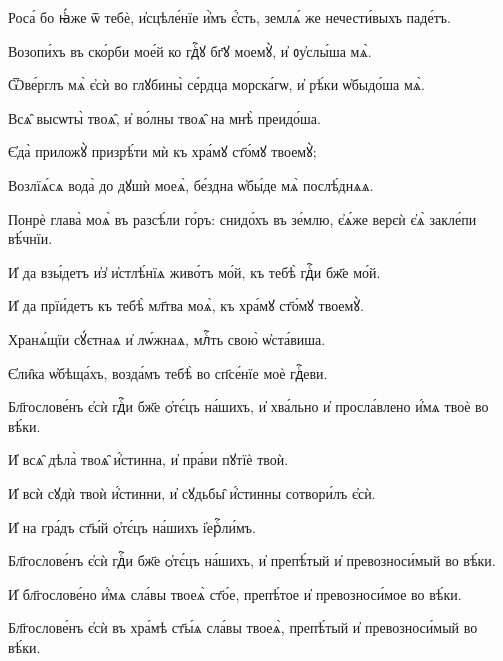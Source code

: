 \hKv Роса́ бо ꙗ҆́же ѿ тебѐ, и҆сцѣле́нїе и҆̀мъ є҆́сть,  землѧ́ же нечести́выхъ паде́тъ. 
%

%

\hKv Возопи́хъ въ ско́рби мое́й ко гдⷭ҇ꙋ бг҃ꙋ моемꙋ̀, и҆  ᲂу҆слы́ша мѧ̀. 

\hKv Ѿве́рглъ мѧ̀ є҆сѝ во глꙋбины̀ се́рдца морска́гѡ, и҆  рѣ́ки ѡ҆быдо́ша мѧ̀. 

\hKv Всѧ̑ высѡты̀ твоѧ̑, и҆ во́лны твоѧ̑ на мнѣ̀ преидо́ша. 

\hKv Є҆да̀ приложꙋ̀ призрѣ́ти мѝ къ хра́мꙋ ст҃о́мꙋ твоемꙋ̀; 
%

\hKv Возлїѧ́сѧ вода̀ до дꙋшѝ моеѧ̀, бе́здна ѡ҆бы́де мѧ̀  послѣ́днѧѧ. 

\hKv Понрѐ глава̀ моѧ̀ въ разсѣ́ли го́ръ: снидо́хъ въ зе́млю,  є҆ѧ́же верєѝ є҆ѧ̀ закле́пи вѣ́чнїи. 
%

\hKv И҆ да взы́детъ и҆з̾ и҆стлѣ́нїѧ живо́тъ мо́й, къ  тебѣ̀ гдⷭ҇и бж҃е мо́й. 

\hKv И҆ да прїи́детъ къ тебѣ̀ мл҃тва моѧ̀, къ хра́мꙋ ст҃о́мꙋ  твоемꙋ̀. 
%

\hKv Хранѧ́щїи сꙋ́єтнаѧ и҆ лѡ́жнаѧ, млⷭ҇ть свою̀  ѡ҆ста́виша.  

\hKv Є҆ли̑ка ѡ҆бѣща́хъ, возда́мъ тебѣ̀ во сп҃се́нїе моѐ  гдⷭ҇еви.  
%


\hKv Бл҃гослове́нъ є҆сѝ гдⷭ҇и бж҃е ѻ҆тє́цъ на́шихъ, и҆  хва́льно и҆ просла́влено и҆́мѧ твоѐ во вѣ́ки. 

\hKv И҆ всѧ̑ дѣла̀ твоѧ̑ и҆́стинна, и҆ пра́ви пꙋтїѐ твоѝ. 

\hKv И҆ всѝ сꙋдѝ твоѝ и҆́стинни, и҆ сꙋдьбы̑ и҆́стинны  сотвори́лъ є҆сѝ.  

\hKv И҆ на гра́дъ ст҃ы́й ѻ҆тє́цъ на́шихъ і҆ерⷭ҇ли́мъ. 
%

\hKv Бл҃гослове́нъ є҆сѝ гдⷭ҇и бж҃е ѻ҆тє́цъ на́шихъ, и҆  препѣ́тый и҆ превозноси́мый во вѣ́ки. 

\hKv И҆ бл҃гослове́но и҆́мѧ сла́вы твоеѧ̀ ст҃о́е, препѣ́тое и҆  превозноси́мое во вѣ́ки. 
%

\hKv Бл҃гослове́нъ є҆сѝ въ хра́мѣ ст҃ы́ѧ сла́вы твоеѧ̀,  препѣ́тый и҆ превозноси́мый во вѣ́ки.  

